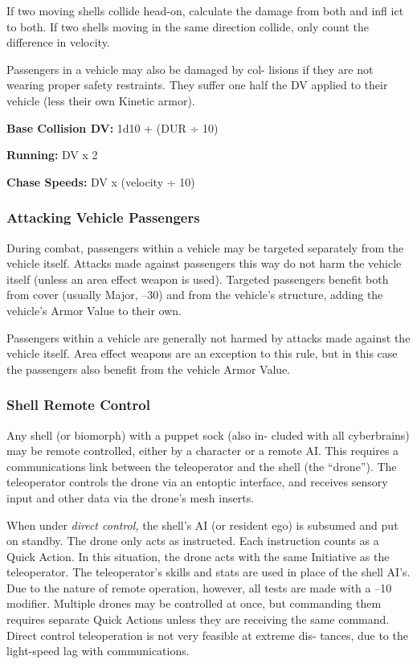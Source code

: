 If two moving shells collide head-on, calculate the 
damage from both and infl ict to both. If two shells 
moving in the same direction collide, only count the 
difference in velocity.

Passengers in a vehicle may also be damaged by col-
lisions if they are not wearing proper safety restraints. 
They suffer one half the DV applied to their vehicle 
(less their own Kinetic armor).

\textbf{Base Collision DV:} 1d10 + (DUR ÷ 10)

\textbf{Running:} DV x 2

\textbf{Chase Speeds:} DV x (velocity ÷ 10)

\subsubsection{Attacking Vehicle Passengers}

During combat, passengers within a vehicle may be 
targeted separately from the vehicle itself. Attacks 
made against passengers this way do not harm the 
vehicle itself (unless an area effect weapon is used). 
Targeted passengers benefit both from cover (usually 
Major, –30) and from the vehicle's structure, adding 
the vehicle's Armor Value to their own.

Passengers within a vehicle are generally not harmed 
by attacks made against the vehicle itself. Area effect 
weapons are an exception to this rule, but in this case 
the passengers also benefit from the vehicle Armor Value.

\subsubsection{Shell Remote Control}

Any shell (or biomorph) with a puppet sock (also in-
cluded with all cyberbrains) may be remote controlled, 
either by a character or a remote AI. This requires a 
communications link between the teleoperator and 
the shell (the ``drone''). The teleoperator controls the 
drone via an entoptic interface, and receives sensory 
input and other data via the drone's mesh inserts.

When under \textit{direct control,} the shell's AI (or resident 
ego) is subsumed and put on standby. The drone only 
acts as instructed. Each instruction counts as a Quick 
Action. In this situation, the drone acts with the same 
Initiative as the teleoperator. The teleoperator's skills and 
stats are used in place of the shell AI's. Due to the nature 
of remote operation, however, all tests are made with a 
–10 modifier. Multiple drones may be controlled at once, 
but commanding them requires separate Quick Actions 
unless they are receiving the same command. Direct 
control teleoperation is not very feasible at extreme dis-
tances, due to the light-speed lag with communications.

